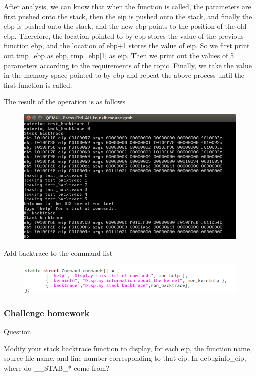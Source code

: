 After analysis, we can know that when the function is called, the parameters are first pushed onto the stack, then the eip is pushed onto the stack, and finally the ebp is pushed onto the stack, and the new ebp points to the position of the old ebp. Therefore, the location pointed to by ebp stores the value of the previous function ebp, and the location of ebp+1 stores the value of eip. So we first print out tmp\_ebp as ebp, tmp\_ebp[1] as eip. Then we print out the values ​​of 5 parameters according to the requirements of the topic. Finally, we take the value in the memory space pointed to by ebp and repeat the above process until the first function is called.

The result of the operation is as follows
\begin{figure}[H]
  \centering
  \includegraphics[width=0.8\linewidth]{figure/mon_backtrace_qemu3}
\end{figure}


Add backtrace to the command list
\begin{figure}[H]
  \centering
  \includegraphics[width=0.8\linewidth]{figure/add_backtrace}
\end{figure}

\subsubsection{Challenge homework}
\begin{flushleft}
{\Large Question}
\end{flushleft}

Modify your stack backtrace function to display, for each eip, the function name, source file name, and line number corresponding to that eip.
In debuginfo\_eip, where do \_\_STAB\_* come from?

